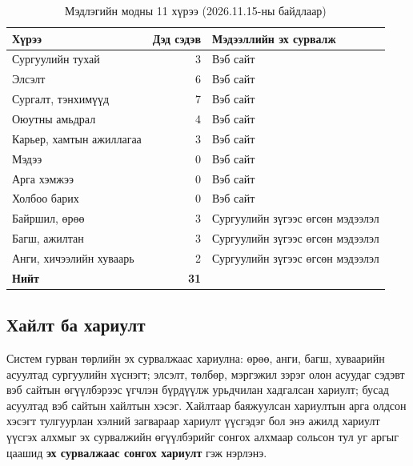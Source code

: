 \begin{table}[htbp]
\centering
\caption{Мэдлэгийн модны 11 хүрээ (2026.11.15-ны байдлаар)}
\label{tab:tree}
\begin{tabular}{|p{5.6cm}|r|p{5.6cm}|}
\hline
\textbf{Хүрээ} & \textbf{Дэд сэдэв} & \textbf{Мэдээллийн эх сурвалж} \\
\hline
Сургуулийн тухай & 3 & Вэб сайт \\
\hline
Элсэлт & 6 & Вэб сайт \\
\hline
Сургалт, тэнхимүүд & 7 & Вэб сайт \\
\hline
Оюутны амьдрал & 4 & Вэб сайт \\
\hline
Карьер, хамтын ажиллагаа & 3 & Вэб сайт \\
\hline
Мэдээ & 0 & Вэб сайт \\
\hline
Арга хэмжээ & 0 & Вэб сайт \\
\hline
Холбоо барих & 0 & Вэб сайт \\
\hline
Байршил, өрөө & 3 & Сургуулийн зүгээс өгсөн мэдээлэл \\
\hline
Багш, ажилтан & 3 & Сургуулийн зүгээс өгсөн мэдээлэл \\
\hline
Анги, хичээлийн хуваарь & 2 & Сургуулийн зүгээс өгсөн мэдээлэл \\
\hline
\textbf{Нийт} & \textbf{31} & \\
\hline
\end{tabular}
\end{table}

\subsection{Хайлт ба хариулт}
\label{sec:rag-steps}

Систем гурван төрлийн эх сурвалжаас хариулна: өрөө, анги, багш, хуваарийн асуултад сургуулийн хүснэгт; элсэлт, төлбөр, мэргэжил зэрэг олон асуудаг сэдэвт вэб сайтын өгүүлбэрээс үгчлэн бүрдүүлж урьдчилан хадгалсан хариулт; бусад асуултад вэб сайтын хайлтын хэсэг. Хайлтаар баяжуулсан хариултын арга олдсон хэсэгт тулгуурлан хэлний загвараар хариулт үүсгэдэг бол энэ ажилд хариулт үүсгэх алхмыг эх сурвалжийн өгүүлбэрийг сонгох алхмаар сольсон тул уг аргыг цаашид \textbf{эх сурвалжаас сонгох хариулт} гэж нэрлэнэ.


